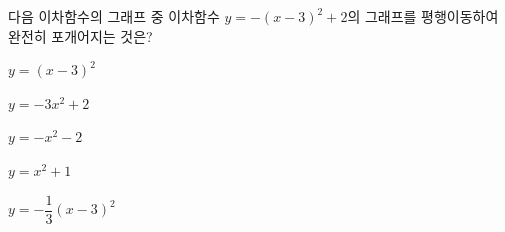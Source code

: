 다음 이차함수의 그래프 중 이차함수 $y=-(x-3)^2+2$의 그래프를 평행이동하여 완전히 포개어지는 것은?
\begin{choicesii}{\rule[-3ex]{0pt}{8ex}$y=(x-3)^2$}{\rule[-3ex]{0pt}{8ex}$y=-3x^2+2$}{\rule[-3ex]{0pt}{8ex}$y=-x^2-2$}{\rule[-3ex]{0pt}{8ex}$y=x^2+1$}{\rule[-3ex]{0pt}{8ex}$y=-\dfrac{1}{3}(x-3)^2$}\end{choicesii}
